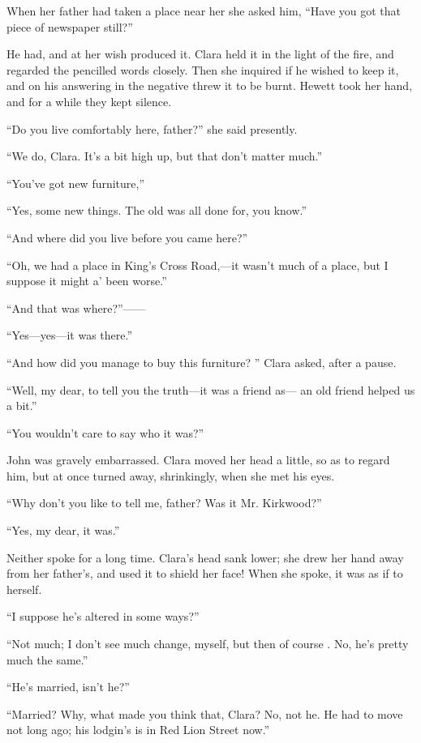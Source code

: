 When her father had taken a place near her {}she asked him, ``Have you
got that piece of newspaper still?''

He had, and at her wish produced it. Clara held it in the light of the
fire, and regarded the pencilled words closely. Then she inquired if he
wished to keep it, and on his answering in the negative threw it to be
burnt. Hewett took her hand, and for a while they kept silence.

``Do you live comfortably here, father?'' she said presently.

``We do, Clara. It's a bit high up, but that don't matter much.''

``You've got new furniture,''

``Yes, some new things. The old was all done for, you know.''

``And where did you live before you came here?''

``Oh, we had a place in King's Cross Road,---it wasn't much of a place,
but I suppose it might a' been worse.''

``And that was where?''{{------}}

``Yes---yes---it was there.''

``And how did you manage to buy this furniture? '' Clara asked, after a
pause.

{}``Well, my dear, to tell you the truth---it was a friend as--- an old
friend helped us a bit.''

``You wouldn't care to say who it was?''

John was gravely embarrassed. Clara moved her head a little, so as to
regard him, but at once turned away, shrinkingly, when she met his eyes.

``Why don't you like to tell me, father? Was it Mr. Kirkwood?''

``Yes, my dear, it was.''

Neither spoke for a long time. Clara's head sank lower; she drew her
hand away from her father's, and used it to shield her face! When she
spoke, it was as if to herself.

``I suppose he's altered in some ways?''

``Not much; I don't see much change, myself, but then of course . No,
he's pretty much the same.''

``He's married, isn't he?''

``Married? Why, what made you think that, Clara? No, not he. He had to
move not long ago; his lodgin's is in Red Lion Street now.''

